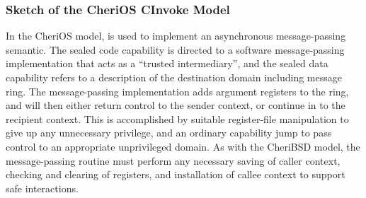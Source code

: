 \subsubsection*{Sketch of the CheriOS CInvoke Model}

In the CheriOS model,  is used to implement an
asynchronous message-passing semantic.
The sealed code capability is directed to a software message-passing
implementation that acts as a ``trusted intermediary'', and the sealed data
capability refers to a description of the destination domain including message
ring.
The message-passing implementation adds argument registers to the ring, and
will then either return control to the sender context, or continue in to the
recipient context.
This is accomplished by suitable register-file manipulation to give up any
unnecessary privilege, and an ordinary capability jump to pass control to an
appropriate unprivileged domain.
As with the CheriBSD model, the message-passing routine must perform any
necessary saving of caller context, checking and clearing of registers, and
installation of callee context to support safe interactions.
